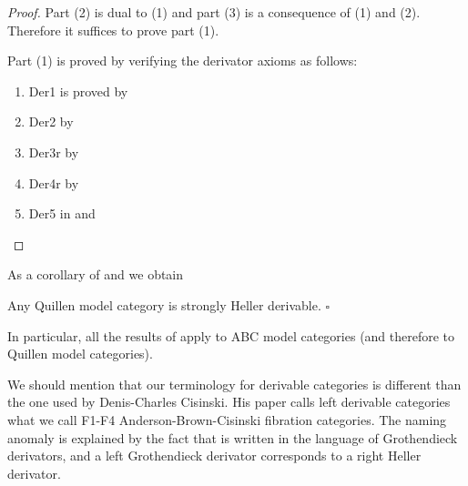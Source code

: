 \begin{proof}
Part (2) is dual to (1) and part (3) is a consequence of (1) and (2). Therefore it suffices to prove part (1). 

Part (1) is proved by verifying the derivator axioms as follows:
\begin{enumerate}
\item[-]
Der1 is proved by 
\item[-]
Der2 by 
\item[-]
Der3r by 
\item[-]
Der4r by 
\item[-]
Der5 in  and 
\end{enumerate}
\end{proof}

As a corollary of  and  we obtain

\begin{thm}
\label{thm:modelcatderivator}
Any Quillen model category is strongly Heller derivable. $\square$
\end{thm}

In particular, all the results of \cite{Heller} apply to ABC model categories (and therefore to Quillen model categories).

We should mention that our terminology for derivable categories is different than the one used by Denis-Charles Cisinski. His paper \cite{Cisinski2} calls left derivable categories what we call F1-F4 Anderson-Brown-Cisinski fibration categories. The naming anomaly is explained by the fact that \cite{Cisinski2} is written in the language of Grothendieck derivators, and a left Grothendieck derivator corresponds to a right Heller derivator.



